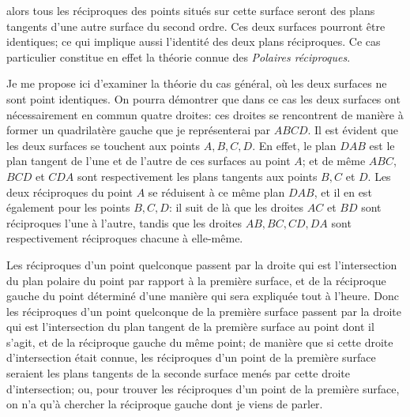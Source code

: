 \documentclass[10pt]{article}
\begin{document}

alors tous les r\'eciproques des points situ\'es sur cette surface seront des plans
tangents d'une autre surface du second ordre. Ces deux surfaces pourront \^etre
identiques; ce qui implique aussi l'identit\'e des deux plans r\'eciproques. Ce cas
particulier constitue en effet la th\'eorie connue des \textit{Polaires r\'eciproques}.

Je me propose ici d'examiner la th\'eorie du cas g\'en\'eral, o\`u les deux surfaces ne
sont point identiques. On pourra d\'emontrer que dans ce cas les deux surfaces ont
n\'ecessairement en commun quatre droites: ces droites se rencontrent de mani\`ere \`a
former un quadrilat\`ere gauche que je repr\'esenterai par $ABCD$. Il est \'evident que
les deux surfaces se touchent aux points $A,B,C,D$. En effet, le plan $DAB$ est le
plan tangent de l'une et de l'autre de ces surfaces au point $A$; et de m\^eme $ABC$,
$BCD$ et $CDA$ sont respectivement les plans tangents aux points $B,C$ et $D$. Les
deux r\'eciproques du point $A$ se r\'eduisent \`a ce m\^eme plan $DAB$, et il en est
\'egalement pour les points $B,C,D$: il suit de l\`a que les droites $AC$ et $BD$ sont
r\'eciproques l'une \`a l'autre, tandis que les droites $AB,BC,CD,DA$ sont
respectivement r\'eciproques chacune \`a elle-m\^eme.

Les r\'eciproques d'un point quelconque passent par la droite qui est l'intersection
du plan polaire du point par rapport \`a la premi\`ere surface, et de la r\'eciproque
gauche du point d\'etermin\'e d'une mani\`ere qui sera expliqu\'ee tout \`a l'heure.
Donc les r\'eciproques d'un point quelconque de la premi\`ere surface passent par la
droite qui est l'intersection du plan tangent de la premi\`ere surface au point dont il
s'agit, et de la r\'eciproque gauche du m\^eme point; de mani\`ere que si cette droite
d'intersection \'etait connue, les r\'eciproques d'un point de la premi\`ere surface
seraient les plans tangents de la seconde surface men\'es par cette droite
d'intersection; ou, pour trouver les r\'eciproques d'un point de la premi\`ere surface,
on n'a qu'\`a chercher la r\'eciproque gauche dont je viens de parler.
\end{document}
